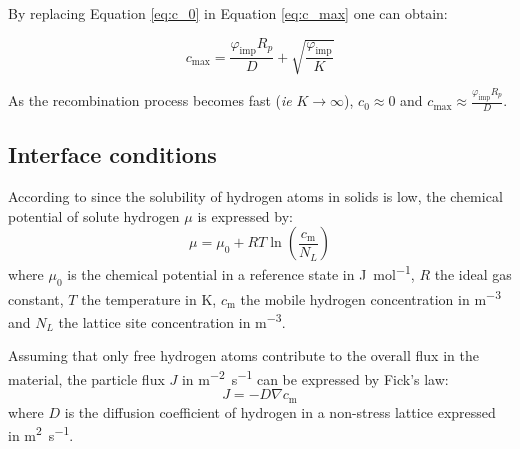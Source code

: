 By replacing Equation \ref{eq:c_0} in Equation \ref{eq:c_max} one can obtain:

\begin{equation}
    c_\mathrm{max} = \frac{\varphi_\mathrm{imp} R_{p}}{D}+\sqrt{\frac{\varphi_\mathrm{imp}}{K}}
\end{equation}

As the recombination process becomes fast (\textit{ie} $K \rightarrow \infty$), $c_0 \approx 0$ and $c_\mathrm{max} \approx \frac{\varphi_\mathrm{imp} R_{p}}{D}$.


\subsection{Interface conditions}
According to  since the solubility of hydrogen atoms in solids is low, the chemical potential of solute hydrogen $\mu$ is expressed by:
\begin{equation}
    \mu = \mu_0 + RT \ln\left( \frac{c_\mathrm{m}}{N_L}\right)
\end{equation}
where $\mu_0$ is the chemical potential in a reference state in \si{J.mol^{-1}}, $R$ the ideal gas constant, $T$ the temperature in \si{K}, $c_\mathrm{m}$ the mobile hydrogen concentration in \si{m^{-3}} and $N_L$ the lattice site concentration in \si{m^{-3}}.

Assuming that only free hydrogen atoms contribute to the overall flux in the material, the particle flux $J$ in \si{m^{-2}.s^{-1}} can be expressed by Fick's law:
\begin{equation}
    J = - D \nabla c_\mathrm{m}
\end{equation}
where $D$ is the diffusion coefficient of hydrogen in a non-stress lattice expressed in \si{m^{2}.s^{-1}}. 





